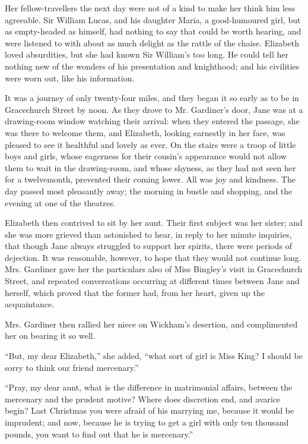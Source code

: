 \documentclass[10pt]{book}
\begin{document}
   Her fellow-travellers the next day were not of a kind to make her think
him less agreeable. Sir William Lucas, and his daughter Maria, a
good-humoured girl, but as empty-headed as himself, had nothing to say
that could be worth hearing, and were listened to with about as much
delight as the rattle of the chaise. Elizabeth loved absurdities, but
she had known Sir William’s too long. He could tell her nothing new of
the wonders of his presentation and knighthood; and his civilities were
worn out, like his information.
  

   It was a journey of only twenty-four miles, and they began it so early
as to be in Gracechurch Street by noon. As they drove to Mr. Gardiner’s
door, Jane was at a drawing-room window watching their arrival: when
they entered the passage, she was there to welcome them, and Elizabeth,
looking earnestly in her face, was pleased to see it healthful and
lovely as ever. On the stairs were a troop of little boys and girls,
whose eagerness for their cousin’s appearance would not allow them to
wait in the drawing-room, and whose shyness, as they had not seen her
for a twelvemonth, prevented their coming lower. All was joy and
kindness. The day passed most pleasantly away; the morning in bustle and
shopping, and the evening at one of the theatres.
  

   Elizabeth then contrived to sit by her aunt. Their first subject was her
sister; and she was more grieved than astonished to hear, in reply to
her minute inquiries, that though Jane always struggled to support her
spirits, there were periods of dejection. It was reasonable, however, to
hope that they would not continue long. Mrs. Gardiner gave her the
particulars also of Miss Bingley’s visit in Gracechurch Street, and
repeated conversations occurring at different times between Jane and
herself,
   which proved that the former had, from her heart, given up the
acquaintance.
  

   Mrs. Gardiner then rallied her niece on Wickham’s desertion, and
complimented her on bearing it so well.
  

   “But, my dear Elizabeth,” she added, “what sort of girl is Miss King? I
should be sorry to think our friend mercenary.”
  

   “Pray, my dear aunt, what is the difference in matrimonial affairs,
between the mercenary and the prudent motive? Where does discretion end,
and avarice begin? Last Christmas you were afraid of his marrying me,
because it would be imprudent; and now, because he is trying to get a
girl with only ten thousand pounds, you want to find out that he is
mercenary.”
  
\end{document}
